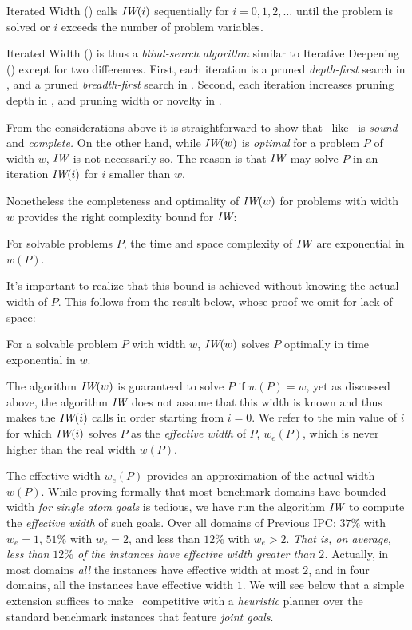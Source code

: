 \documentclass[letterpaper]{article}
\begin{document}
{  \begin{definition}
    Iterated Width  (\IR) calls ${\textit{IW}}(i)$ sequentially for $i=0,1,2,\ldots$ until
    the problem is solved or $i$ exceeds the number of problem variables.
  \end{definition}



  Iterated  Width (\IR) is thus a \emph{blind-search algorithm} similar to Iterative Deepening (\ID)
  except for two differences. First, each iteration  is a pruned \emph{depth-first} search in \ID,
  and  a pruned \emph{breadth-first} search in \IR. Second,  each iteration increases pruning  depth
  in \ID, and pruning width or novelty in \IR.


  From the considerations above it is straightforward to show that
  \IR\ like \ID\ is \emph{sound} and \emph{complete.}  On the other
  hand, while ${\textit{IW}}(w)$ is \emph{optimal} for a problem $P$ of width $w$,
  ${\textit{IW}}$ is not necessarily so. The reason is that ${\textit{IW}}$ may solve $P$ in
  an iteration ${\textit{IW}}(i)$ for $i$ smaller than $w$.%


  Nonetheless the completeness and optimality of ${\textit{IW}}(w)$ for problems
  with width $w$ provides the right complexity bound for ${\textit{IW}}$:
  \begin{theorem}
    For solvable problems $P$, the time and space complexity of ${\textit{IW}}$
    are  exponential in $w(P)$.
  \end{theorem}
  It's important to realize that this bound is achieved without knowing the
  actual width of $P$. This follows from the result below, whose
  proof we omit for lack of space:

  \begin{theorem}
    For a  solvable problem $P$ with width $w$,  ${\textit{IW}}(w)$ solves $P$ optimally
    in time exponential in $w$.
  \end{theorem}



  The  algorithm ${\textit{IW}}(w)$ is guaranteed to solve $P$ if $w(P)=w$,
  yet as discussed above, the algorithm ${\textit{IW}}$ does not assume
  that this width is known  and thus makes the ${\textit{IW}}(i)$ calls in order
  starting from $i=0$. We  refer to the min value of $i$
  for which ${\textit{IW}}(i)$ solves $P$ as the \emph{effective width} of $P$,
  $w_e(P)$, which is never higher than the real width $w(P)$.



  The effective width $w_e(P)$ provides an approximation of the actual
  width $w(P)$.  While proving formally that most benchmark domains have
  bounded width \emph{for single atom goals} is tedious, we have run the
  algorithm ${\textit{IW}}$ to compute the \emph{effective width} of such
  goals. Over all domains of Previous IPC: $37\%$ with $w_e=1$, $51\%$
  with $w_e=2$, and less than $12\%$ with $w_e > 2$. \emph{That is, on
    average, less than $12\%$ of the instances have effective width
    greater than $2$.}  Actually, in most domains \emph{all} the
  instances have effective width at most $2$, and in four domains, all
  the instances have effective width $1$. We will see below that a
  simple extension suffices to make \IR\ competitive with a
  \emph{heuristic} planner over the standard benchmark instances that
  feature \emph{joint goals}.

}
\end{document}
